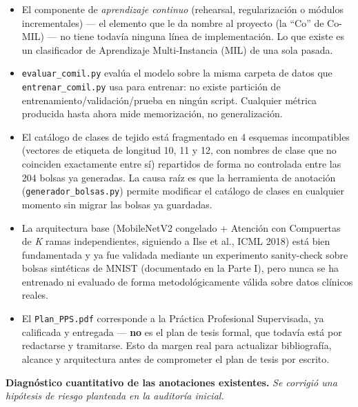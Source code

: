 \documentclass[12pt,letterpaper]{report}
\newcommand{\entrada}[2]{%
    \vspace{0.6em}
    \noindent\textbf{#1.} \textit{#2}
    \vspace{0.3em}
    \par
}
\begin{document}
\begin{itemize}[leftmargin=1.5em]
    \item El componente de \emph{aprendizaje continuo} (rehearsal, regularización o módulos
        incrementales) --- el elemento que le da nombre al proyecto (la ``Co'' de Co-MIL) --- no
        tiene todavía ninguna línea de implementación. Lo que existe es un clasificador de
        Aprendizaje Multi-Instancia (MIL) de una sola pasada.
    \item \texttt{evaluar\_comil.py} evalúa el modelo sobre la misma carpeta de datos que
        \texttt{entrenar\_comil.py} usa para entrenar: no existe partición de
        entrenamiento/validación/prueba en ningún script. Cualquier métrica producida hasta ahora
        mide memorización, no generalización.
    \item El catálogo de clases de tejido está fragmentado en 4 esquemas incompatibles (vectores de
        etiqueta de longitud 10, 11 y 12, con nombres de clase que no coinciden exactamente entre
        sí) repartidos de forma no controlada entre las 204 bolsas ya generadas. La causa raíz es
        que la herramienta de anotación (\texttt{generador\_bolsas.py}) permite modificar el
        catálogo de clases en cualquier momento sin migrar las bolsas ya guardadas.
    \item La arquitectura base (MobileNetV2 congelado + Atención con Compuertas de \emph{K} ramas
        independientes, siguiendo a Ilse et al., ICML 2018) está bien fundamentada y ya fue
        validada mediante un experimento sanity-check sobre bolsas sintéticas de MNIST (documentado
        en la Parte I), pero nunca se ha entrenado ni evaluado de forma metodológicamente válida
        sobre datos clínicos reales.
    \item El \texttt{Plan\_PPS.pdf} corresponde a la Práctica Profesional Supervisada, ya calificada
        y entregada --- \textbf{no} es el plan de tesis formal, que todavía está por redactarse y
        tramitarse. Esto da margen real para actualizar bibliografía, alcance y arquitectura antes
        de comprometer el plan de tesis por escrito.
\end{itemize}

\entrada{Diagnóstico cuantitativo de las anotaciones existentes}{Se corrigió una hipótesis de
riesgo planteada en la auditoría inicial.}
\end{document}
